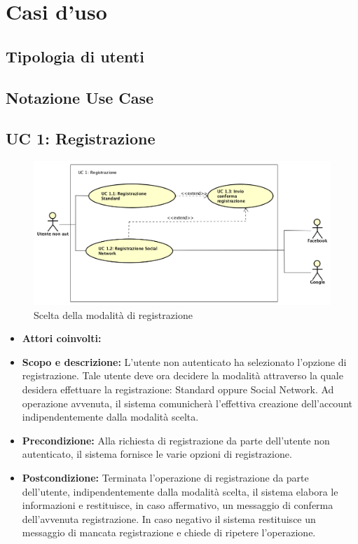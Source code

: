 \section{Casi d'uso}
\subsection{Tipologia di utenti}
\subsection{Notazione Use Case}
\subsection{UC 1: Registrazione}
	\begin{figure}[htbp]
		\centering
		\includegraphics[scale=0.5]{../../Casi D'uso/UC1.png}
		\caption{Scelta della modalità di registrazione}
	\end{figure}
	\begin{itemize}
		\item \textbf{Attori coinvolti:}
		\item \textbf{Scopo e descrizione:} L'utente non autenticato ha selezionato l'opzione di registrazione. Tale utente deve ora decidere la modalità attraverso la quale desidera effettuare la registrazione: Standard oppure Social Network. Ad operazione avvenuta, il sistema comunicherà l'effettiva creazione dell'account indipendentemente dalla modalità scelta. \\
		\item \textbf{Precondizione:} Alla richiesta di registrazione da parte dell'utente non autenticato, il sistema fornisce le varie opzioni di registrazione. \\
		\item \textbf{Postcondizione:} Terminata l'operazione di registrazione da parte dell'utente, indipendentemente dalla modalità scelta, il sistema elabora le informazioni e restituisce, in caso affermativo, un messaggio di conferma dell'avvenuta registrazione. In caso negativo il sistema restituisce un messaggio di mancata registrazione e chiede di ripetere l'operazione. \\
	\end{itemize}
